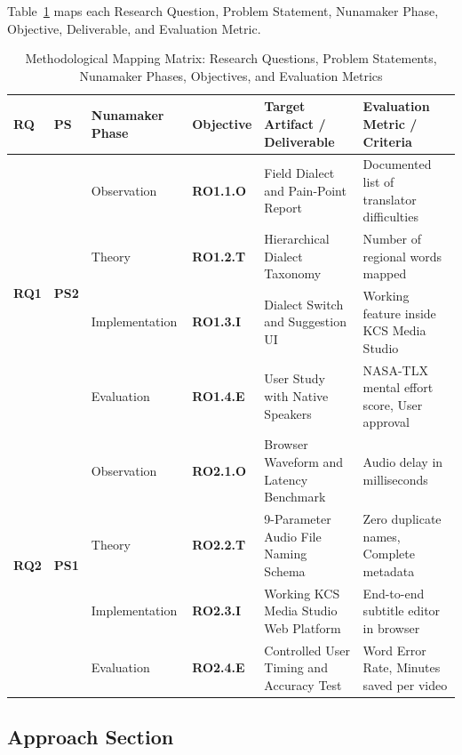 \documentclass[a4paper,11pt]{article}
\begin{document}
Table~\ref{tab:methodology_mapping} maps each Research Question, Problem Statement, Nunamaker Phase, Objective, Deliverable, and Evaluation Metric.

\begin{table}[t]
\centering
\small
\caption{Methodological Mapping Matrix: Research Questions, Problem Statements, Nunamaker Phases, Objectives, and Evaluation Metrics}
\label{tab:methodology_mapping}
\begin{tabular}{p{1.0cm} p{1.0cm} p{2.6cm} p{1.6cm} p{5.3cm} p{4.0cm}}
\toprule
\textbf{RQ} & \textbf{PS} & \textbf{Nunamaker Phase} & \textbf{Objective} & \textbf{Target Artifact / Deliverable} & \textbf{Evaluation Metric / Criteria} \\
\midrule
\multirow{4}{*}{\textbf{RQ1}} & \multirow{4}{*}{\textbf{PS2}} & Observation & \textbf{RO1.1.O} & Field Dialect and Pain-Point Report & Documented list of translator difficulties \\
\addlinespace
& & Theory & \textbf{RO1.2.T} & Hierarchical Dialect Taxonomy & Number of regional words mapped \\
\addlinespace
& & Implementation & \textbf{RO1.3.I} & Dialect Switch and Suggestion UI & Working feature inside KCS Media Studio \\
\addlinespace
& & Evaluation & \textbf{RO1.4.E} & User Study with Native Speakers & NASA-TLX mental effort score, User approval \\
\midrule
\multirow{4}{*}{\textbf{RQ2}} & \multirow{4}{*}{\textbf{PS1}} & Observation & \textbf{RO2.1.O} & Browser Waveform and Latency Benchmark & Audio delay in milliseconds \\
\addlinespace
& & Theory & \textbf{RO2.2.T} & 9-Parameter Audio File Naming Schema & Zero duplicate names, Complete metadata \\
\addlinespace
& & Implementation & \textbf{RO2.3.I} & Working KCS Media Studio Web Platform & End-to-end subtitle editor in browser \\
\addlinespace
& & Evaluation & \textbf{RO2.4.E} & Controlled User Timing and Accuracy Test & Word Error Rate, Minutes saved per video \\
\bottomrule
\end{tabular}
\end{table}

\subsection{Approach Section}
\label{sec:chap1_approach}
\end{document}
